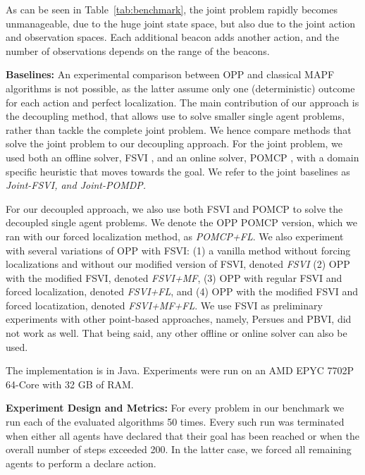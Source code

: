 \documentclass[letterpaper]{article}
\newcommand{\guy}[1]{\textcolor{blue}{[Guy: #1]}}
\begin{document}
As can be seen in Table~\ref{tab:benchmark}, the joint problem rapidly becomes unmanageable, due to the huge joint state space, but also due to the joint action and observation spaces. Each additional beacon adds another action, and the number of observations depends on the range of the beacons.


\noindent\textbf{Baselines:} An experimental comparison between OPP and classical MAPF algorithms is not possible, as the latter assume only one (deterministic) outcome for each action and perfect localization.
The main contribution of our approach is the decoupling method, that allows use to solve smaller single agent problems, rather than tackle the complete joint problem. We hence compare methods that solve the joint problem to our decoupling approach. For the joint problem, we used both an offline solver, FSVI \cite{shani2013survey}, and an online solver, POMCP \cite{silver2010monte}, with a domain specific heuristic that moves towards the goal. We refer to the joint baselines as \em{Joint-FSVI}, and \em{Joint-POMDP}. %

For our decoupled approach, we also use both FSVI and POMCP to solve the decoupled single agent problems. We denote the OPP POMCP version, which we ran with our forced localization method, as \emph{POMCP+FL}.
We also experiment with several variations of OPP with FSVI: (1) a vanilla method without forcing localizations and without our modified version of FSVI, denoted \emph{FSVI} (2) OPP with the modified FSVI, denoted \emph{FSVI+MF},  (3) OPP with regular FSVI and forced localization, denoted \emph{FSVI+FL}, and (4) OPP with the modified FSVI and forced locatization, denoted \emph{FSVI+MF+FL}.
We use FSVI as preliminary experiments with other point-based approaches, namely, Persues and PBVI, did not work as well. That being said, any other offline or online solver can also be used.




The implementation is in Java. Experiments were run on an AMD\textsc{\textregistered} EPYC 7702P 64-Core with 32 GB of RAM.



\noindent\textbf{Experiment Design and Metrics:}
For every problem in our benchmark we run each of the evaluated algorithms 50 times.
Every such run was terminated when either all agents have declared that their goal has been reached or when the overall number of steps exceeded 200. In the latter case, we forced all remaining agents to perform a declare action.
\end{document}
